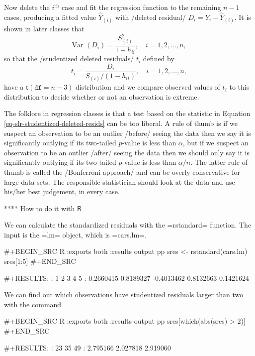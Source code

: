 Now delete the \(i^{\mathrm{th}}\) case and fit the regression
function to the remaining \(n - 1\) cases, producing a fitted value
\(\hat{Y}_{(i)}\) with /deleted residual/
\(D_{i}=Y_{i}-\hat{Y}_{(i)}\). It is shown in later classes that
\begin{equation}
\mbox{Var $(D_{i})$}=\frac{S_{(i)}^{2}}{1-h_{ii}},\quad i=1,2,\ldots,n,
\end{equation}
so that the /studentized deleted residuals/ \(t_{i}\) defined by
\begin{equation}
\label{eq-slr-studentized-deleted-resids}
t_{i}=\frac{D_{i}}{S_{(i)}/(1-h_{ii})},\quad i=1,2,\ldots,n,
\end{equation}
have a \(\mathsf{t}(\mathtt{df}=n-3)\) distribution and we compare observed values of \(t_{i}\) to this distribution to decide whether or not an observation is extreme. 

The folklore in regression classes is that a test based on the
statistic in Equation \eqref{eq-slr-studentized-deleted-resids} can be
too liberal. A rule of thumb is if we suspect an observation to be an
outlier /before/ seeing the data then we say it is significantly
outlying if its two-tailed \(p\)-value is less than \(\alpha\), but if
we suspect an observation to be an outlier /after/ seeing the data
then we should only say it is significantly outlying if its two-tailed
\(p\)-value is less than \(\alpha/n\). The latter rule of thumb is
called the /Bonferroni approach/ and can be overly conservative for
large data sets. The responsible statistician should look at the data
and use his/her best judgement, in every case.

**** How to do it with \(\mathsf{R}\)

We can calculate the standardized residuals with the =rstandard=
function. The input is the =lm= object, which is =cars.lm=.

#+BEGIN_SRC R :exports both :results output pp 
sres <- rstandard(cars.lm)
sres[1:5]
#+END_SRC

#+RESULTS:
:          1          2          3          4          5 
:  0.2660415  0.8189327 -0.4013462  0.8132663  0.1421624

We can find out which observations have studentized residuals larger
than two with the command

#+BEGIN_SRC R :exports both :results output pp 
sres[which(abs(sres) > 2)]
#+END_SRC

#+RESULTS:
:       23       35       49 
: 2.795166 2.027818 2.919060

